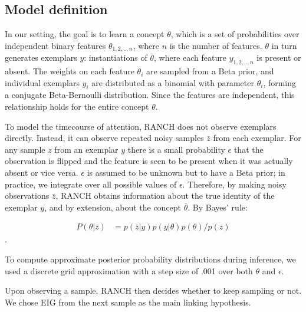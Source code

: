 \documentclass[10pt, letterpaper]{article}
\begin{document}
\hypertarget{model-definition}{%
\subsection{Model definition}\label{model-definition}}

In our setting, the goal is to learn a concept \(\theta\), which is a
set of probabilities over independent binary features
\(\theta_{1,2,..,n}\), where \(n\) is the number of features. \(\theta\)
in turn generates exemplars \(y\): instantiations of \(\bar{\theta}\),
where each feature \(y_{1,2,..,n}\) is present or absent. The weights on
each feature \(\theta_i\) are sampled from a Beta prior, and individual
exemplars \(y_i\) are distributed as a binomial with parameter
\(\theta_i\), forming a conjugate Beta-Bernoulli distribution. Since the
features are independent, this relationship holds for the entire concept
\(\theta\).

To model the timecourse of attention, RANCH does not observe exemplars
directly. Instead, it can observe repeated noisy samples \(\bar{z}\)
from each exemplar. For any sample \(z\) from an exemplar \(y\) there is
a small probability \(\epsilon\) that the observation is flipped and the
feature is seen to be present when it was actually absent or vice versa.
\(\epsilon\) is assumed to be unknown but to have a Beta prior; in
practice, we integrate over all possible values of \(\epsilon\).
Therefore, by making noisy observations \(\bar{z}\), RANCH obtains
information about the true identity of the exemplar \(y\), and by
extension, about the concept \(\bar{\theta}\). By Bayes' rule:

\begin{eqnarray}
P(\theta|\bar{z}) &= p(\bar{z}|y) p(y|\theta) p(\theta) / p(\bar{z})
\end{eqnarray}.

To compute approximate posterior probability distributions during
inference, we used a discrete grid approximation with a step size of
.001 over both \(\theta\) and \(\epsilon\).

Upon observing a sample, RANCH then decides whether to keep sampling or
not. We chose EIG from the next sample as the main linking hypothesis.
\end{document}
